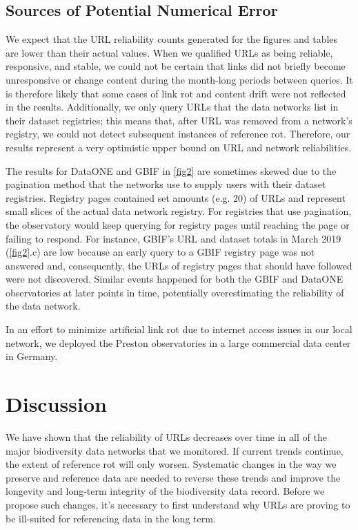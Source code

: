\documentclass[10pt,letterpaper]{article}
\begin{document}
\subsection*{Sources of Potential Numerical Error}
We expect that the URL reliability counts generated for the figures and tables are lower than their actual values. When we qualified URLs as being reliable, responsive, and stable, we could not be certain that links did not briefly become unresponsive or change content during the month-long periods between queries. It is therefore likely that some cases of link rot and content drift were not reflected in the results. Additionally, we only query URLs that the data networks list in their dataset registries; this means that, after URL was removed from a network’s registry, we could not detect subsequent instances of reference rot. Therefore, our results represent a very optimistic upper bound on URL and network reliabilities.

The results for DataONE and GBIF in \ref{fig2} are sometimes skewed due to the pagination method that the networks use to supply users with their dataset registries. Registry pages contained set amounts (e.g. 20) of URLs and represent small slices of the actual data network registry. For registries that use pagination, the observatory would keep querying for registry pages until reaching the page or failing to respond. For instance, GBIF’s URL and dataset totals in March 2019 (\ref{fig2}.c) are low because an early query to a GBIF registry page was not answered and, consequently, the URLs of registry pages that should have followed were not discovered. Similar events happened for both the GBIF and DataONE observatories at later points in time, potentially overestimating the reliability of the data network.

In an effort to minimize artificial link rot due to internet access issues in our local network, we deployed the Preston observatories in a large commercial data center in Germany.

\section*{Discussion}

We have shown that the reliability of URLs decreases over time in all of the major biodiversity data networks that we monitored. If current trends continue, the extent of reference rot will only worsen. Systematic changes in the way we preserve and reference data are needed to reverse these trends and improve the longevity and long-term integrity of the biodiversity data record. Before we propose such changes, it’s necessary to first understand why URLs are proving to be ill-suited for referencing data in the long term.
\end{document}
